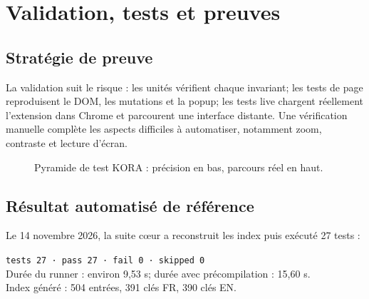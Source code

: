 \section{Validation, tests et preuves}

\subsection{Stratégie de preuve}

La validation suit le risque : les unités vérifient chaque invariant; les
tests de page reproduisent le DOM, les mutations et la popup; les tests live
chargent réellement l’extension dans Chrome et parcourent une interface
distante. Une vérification manuelle complète les aspects difficiles à
automatiser, notamment zoom, contraste et lecture d’écran.

\begin{figure}[H]
\centering
{}
\caption{Pyramide de test KORA : précision en bas, parcours réel en haut.}
\end{figure}

\subsection{Résultat automatisé de référence}

Le 14 novembre 2026, la suite cœur a reconstruit les index puis exécuté
27 tests :

\begin{keybox}
\texttt{tests 27 · pass 27 · fail 0 · skipped 0}\\
Durée du runner : environ 9,53 s; durée avec précompilation : 15,60 s.\\
Index généré : 504 entrées, 391 clés FR, 390 clés EN.
\end{keybox}

